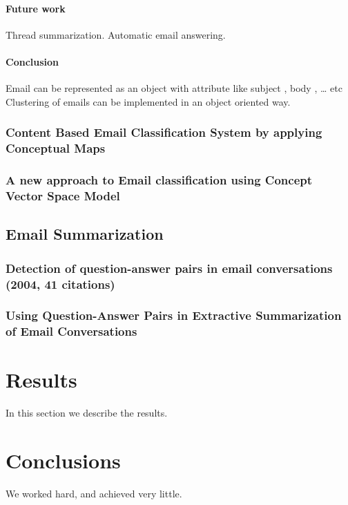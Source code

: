 \documentclass[12pt]{article}
\begin{document}
\paragraph{Future work}
Thread summarization.
Automatic email answering.

\paragraph{Conclusion}
Email can be represented as an object with attribute like subject , body , … etc
Clustering of emails can be implemented in an object oriented way.




\subsubsection{Content Based Email Classification System by applying Conceptual Maps}
\subsubsection{A new approach to Email classification using Concept Vector Space Model}

\subsection{Email Summarization}
\subsubsection{Detection of question-answer pairs in email conversations (2004, 41 citations)}
\subsubsection{Using Question-Answer Pairs in Extractive Summarization of Email Conversations}

\section{Results}\label{results}
In this section we describe the results.

\section{Conclusions}\label{conclusions}
We worked hard, and achieved very little.



\end{document}
